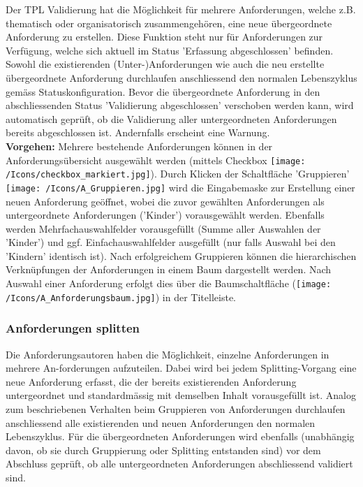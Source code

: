 Der TPL Validierung hat die Möglichkeit für mehrere Anforderungen, welche z.B. thematisch oder organisatorisch zusammengehören, eine neue übergeordnete Anforderung zu erstellen. Diese Funktion steht nur für Anforderungen zur Verfügung, welche sich aktuell im Status 'Erfassung abgeschlossen' befinden. Sowohl die existierenden (Unter-)Anforderungen wie auch die neu erstellte übergeordnete Anforderung durchlaufen anschliessend den normalen Lebenszyklus gemäss Statuskonfiguration. Bevor die übergeordnete Anforderung in den abschliessenden Status 'Validierung abgeschlossen' verschoben werden kann, wird automatisch geprüft, ob die Validierung aller untergeordneten Anforderungen bereits abgeschlossen ist. Andernfalls erscheint eine Warnung. \\

\textbf{Vorgehen:}
Mehrere bestehende Anforderungen können in der Anforderungsübersicht ausgewählt werden (mittels Checkbox \texttt{[image: /Icons/checkbox\_markiert.jpg]}). Durch Klicken der Schaltfläche 'Gruppieren' \texttt{[image: /Icons/A\_Gruppieren.jpg]} wird die Eingabemaske zur Erstellung einer neuen Anforderung geöffnet, wobei die zuvor gewählten Anforderungen als untergeordnete Anforderungen ('Kinder') vorausgewählt werden. Ebenfalls werden Mehrfachauswahlfelder vorausgefüllt (Summe aller Auswahlen der 'Kinder') und ggf. Einfachauswahlfelder ausgefüllt (nur falls Auswahl bei den 'Kindern' identisch ist).
Nach erfolgreichem Gruppieren können die hierarchischen Verknüpfungen der Anforderungen in einem Baum dargestellt werden. Nach Auswahl einer Anforderung erfolgt dies über die Baumschaltfläche (\texttt{[image: /Icons/A\_Anforderungsbaum.jpg]}) in der Titelleiste.

\subsubsection{Anforderungen splitten}

Die Anforderungsautoren haben die Möglichkeit, einzelne Anforderungen in mehrere An-forderungen aufzuteilen. Dabei wird bei jedem Splitting-Vorgang eine neue Anforderung erfasst, die der bereits existierenden Anforderung untergeordnet und standardmässig mit demselben Inhalt vorausgefüllt ist. Analog zum beschriebenen Verhalten beim Gruppieren von Anforderungen durchlaufen anschliessend alle existierenden und neuen Anforderungen den normalen Lebenszyklus. Für die übergeordneten Anforderungen wird ebenfalls (unabhängig davon, ob sie durch Gruppierung oder Splitting entstanden sind) vor dem Abschluss geprüft, ob alle untergeordneten Anforderungen abschliessend validiert sind. \\

